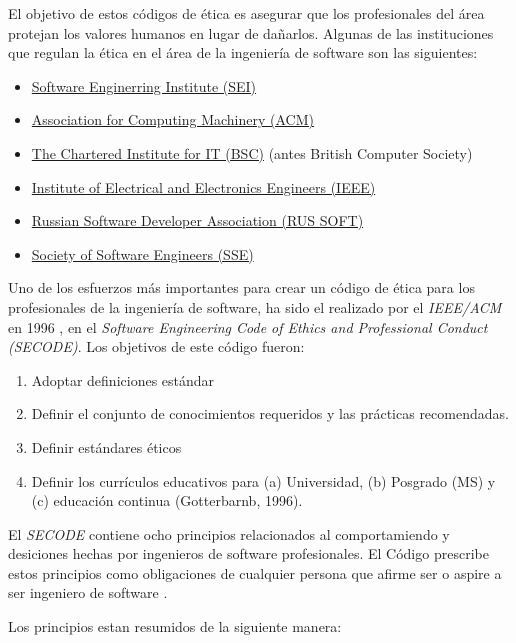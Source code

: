\documentclass[twoside]{article}
\begin{document}
\begin{multicols}{2}
El objetivo de estos códigos de ética es asegurar que los profesionales del área
protejan los valores humanos en lugar de dañarlos. Algunas de las instituciones
que regulan la ética en el área de la ingeniería de software son las siguientes:

\begin{itemize}
    \item \href{https://www.sei.cmu.edu/}{Software Enginerring Institute (SEI)}
    \item \href{https://www.acm.org/}{Association for Computing Machinery (ACM)}
\item \href{https://www.bcs.org/}{The Chartered Institute for IT (BSC)} (antes
British Computer Society)
\item \href{https://www.ieee.org/}{Institute of Electrical and Electronics
Engineers (IEEE)} \cite{rogerson2002software}
    \item \href{https://russoft.org/}{Russian Software Developer Association (RUS SOFT)}
    \item \href{https://sse.rit.edu/}{Society of Software Engineers (SSE)}
\end{itemize}

Uno de los esfuerzos más importantes para crear un código de ética para los
profesionales de la ingeniería de software, ha sido el realizado por el
\textit{IEEE/ACM} en 1996 \cite{gotterbarn2001software}, en el \textit{Software
Engineering Code of Ethics and Professional Conduct (SECODE)}. Los objetivos de este
código fueron:

\begin{enumerate}
    \item Adoptar definiciones estándar
    \item Definir el conjunto de conocimientos requeridos y las prácticas recomendadas.
    \item Definir estándares éticos
    \item Definir los currículos educativos para (a) Universidad, (b) Posgrado (MS) y (c)
educación continua (Gotterbarnb, 1996).
\end{enumerate}

El \textit{SECODE} contiene ocho principios relacionados al comportamiendo y
desiciones hechas por ingenieros de software profesionales. El Código prescribe
estos principios como obligaciones de cualquier persona que afirme ser o aspire
a ser ingeniero de software \cite{vallor2015introduction}.

Los principios estan resumidos de la siguiente manera:


\end{multicols}
\end{document}

